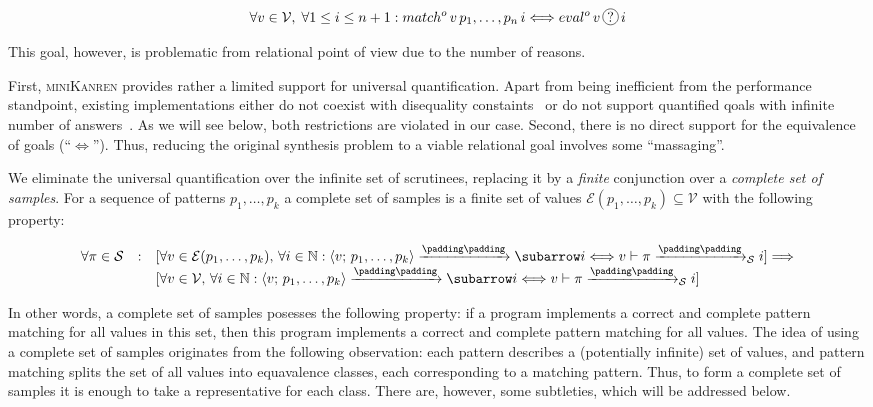 \[
\forall v\in \mathcal V,\; \forall 1\le i\le n+1 : match^o\,v\,p_1,\dots,p_n\,i\Longleftrightarrow eval^o\,v\,\circled{?}\,i
\]

This goal, however, is problematic from relational point of view due to the number of reasons.

First, \textsc{miniKanren} provides rather a limited support for universal quantification. Apart from being inefficient from
the performance standpoint, existing implementations either do not coexist with disequality constaints~\cite{eigen}
or do not support quantified qoals with infinite number of answers~\cite{moiseenko}. As we will see below, both restrictions are
violated in our case. Second, there is no direct support for the equivalence of goals (``$\Leftrightarrow$''). Thus,
reducing the original synthesis problem to a viable relational goal involves some ``massaging''.

We eliminate the universal quantification over the infinite set of scrutinees, replacing it by a \emph{finite}
conjunction over a \emph{complete set of samples}. For a sequence of patterns $p_1,\dots,p_k$ a
complete set of samples is a finite set of values $\mathcal{E}(p_1,\dots,p_k)\subseteq\mathcal{V}$ with the following
property:

\[
\setarrow{\xrightarrow}
\begin{array}{rcl}
  \forall\pi\in\mathcal S & : & [\forall v\in\mathcal{E}(p_1,\dots,p_k),\,\forall i\in\mathbb{N} : \trans{\inbr{v;\,p_1,\dots,p_k}}{}{i} \Longleftrightarrow {\setsubarrow{_{\mathcal S}}\withenv{v}{\trans{\pi}{}{i}}}] \Longrightarrow \\
                          &   & [\forall v\in\mathcal V,\,\forall i\in\mathbb{N} : \trans{\inbr{v;\,p_1,\dots,p_k}}{}{i} \Longleftrightarrow  {\setsubarrow{_{\mathcal S}}\withenv{v}{\trans{\pi}{}{i}}}]
\end{array}
\]

In other words, a complete set of samples posesses the following property: if a program implements a correct and complete pattern matching for all values in this set, then this
program implements a correct and complete pattern matching for all values. The idea of using a complete set of samples originates from the following observation: each pattern
describes a (potentially infinite) set of values, and pattern matching splits the set of all values into equavalence classes, each corresponding to a matching pattern. Thus,
to form a complete set of samples it is enough to take a representative for each class. There are, however, some subtleties, which will be addressed below.

